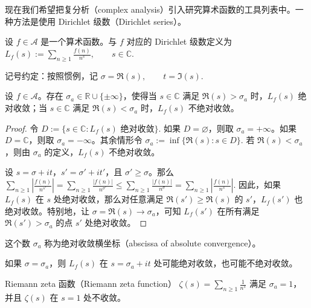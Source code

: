 现在我们希望把复分析（complex analysis）引入研究算术函数的工具列表中。一种方法是使用 Dirichlet 级数（Dirichlet series）。

\begin{definition}
	设 $f\in\mathcal A$ 是一个算术函数。与 $f$ 对应的 Dirichlet 级数定义为
	\(\textstyle L_f(s):=\allowbreak{}\sum_{n\geq\allowbreak{} 1}\frac{f(n)}{n^s},\allowbreak{} \qquad s\in\mathbb C.\)
\end{definition}

记号约定：按照惯例，记
\(\textstyle \sigma=\allowbreak{}\Re(s),\allowbreak{}\qquad t=\allowbreak{}\Im(s).\)

\begin{theorem}[原文 Theorem 4.1]
	设 $f\in\mathcal A$。存在 $\sigma_a\in\mathbb R\cup\{\pm\infty\}$，使得当 $s\in\mathbb C$ 满足 $\Re(s)>\sigma_a$ 时，$L_f(s)$ 绝对收敛；当 $s\in\mathbb C$ 满足 $\Re(s)<\sigma_a$ 时，$L_f(s)$ 不绝对收敛。
\end{theorem}

\begin{proof}
	令
	\(\textstyle D:=\allowbreak{}\{s\in\mathbb C:L_f(s)\text{ 绝对收敛}\}.\)
	如果 $D=\varnothing$，则取 $\sigma_a=+\infty$。如果 $D=\mathbb C$，则取 $\sigma_a=-\infty$。其余情形令
	\(\textstyle \sigma_a:=\allowbreak{}\inf\{\Re(s):s\in D\}.\)
	若 $\Re(s)<\sigma_a$，则由 $\sigma_a$ 的定义，$L_f(s)$ 不绝对收敛。

	设 $s=\sigma+it$，$s'=\sigma'+it'$，且 $\sigma'\geq\sigma$。那么
	\(\textstyle \sum_{n\geq\allowbreak{} 1}\left|\frac{f(n)}{n^{s'}}\right| =\allowbreak{} \sum_{n\geq\allowbreak{} 1}\frac{|f(n)|}{n^{\sigma'}} \leq\allowbreak{} \sum_{n\geq\allowbreak{} 1}\frac{|f(n)|}{n^\sigma} =\allowbreak{} \sum_{n\geq\allowbreak{} 1}\left|\frac{f(n)}{n^s}\right|.\)
	因此，如果 $L_f(s)$ 在 $s$ 处绝对收敛，那么对任意满足 $\Re(s')\geq\Re(s)$ 的 $s'$，$L_f(s')$ 也绝对收敛。特别地，让 $\sigma=\Re(s)\to\sigma_a$，可知 $L_f(s')$ 在所有满足 $\Re(s')>\sigma_a$ 的点 $s'$ 处绝对收敛。
\end{proof}

这个数 $\sigma_a$ 称为绝对收敛横坐标（abscissa of absolute convergence）。

\begin{remark}
	如果 $\sigma=\sigma_a$，则 $L_f(s)$ 在 $s=\sigma_a+it$ 处可能绝对收敛，也可能不绝对收敛。
\end{remark}

\begin{example}
	Riemann zeta 函数（Riemann zeta function）
	\(\textstyle \zeta(s)=\allowbreak{}\sum_{n\geq\allowbreak{} 1}\frac1{n^s}\)
	满足 $\sigma_a=1$，并且 $\zeta(s)$ 在 $s=1$ 处不收敛。
\end{example}

